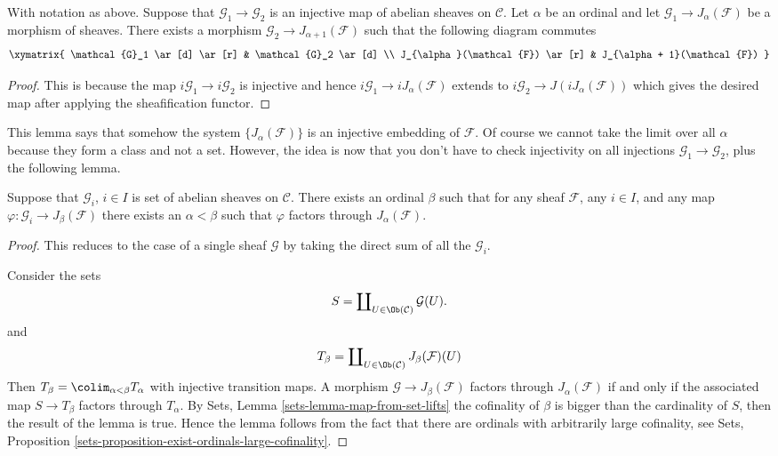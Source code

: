 \begin{lemma}
\label{lemma-map-into-next-one}
With notation as above.
Suppose that $\mathcal{G}_1 \to \mathcal{G}_2$ is an injective
map of abelian sheaves on $\mathcal{C}$. Let $\alpha$ be an ordinal
and let $\mathcal{G}_1 \to J_\alpha(\mathcal{F})$ be a morphism
of sheaves. There exists a morphism $\mathcal{G}_2 \to
J_{\alpha + 1}(\mathcal{F})$ such that the following diagram commutes
$$
\xymatrix{
\mathcal{G}_1 \ar[d] \ar[r] & \mathcal{G}_2 \ar[d] \\
J_{\alpha}(\mathcal{F}) \ar[r] & J_{\alpha + 1}(\mathcal{F}) }
$$
\end{lemma}

\begin{proof}
This is because the map $i\mathcal{G}_1 \to i\mathcal{G}_2$ is injective
and hence $i\mathcal{G}_1 \to iJ_\alpha(\mathcal{F})$ extends to
$i\mathcal{G}_2 \to J(iJ_\alpha(\mathcal{F}))$ which gives the
desired map after applying the sheafification functor.
\end{proof}

\noindent
This lemma says that somehow the system $\{J_{\alpha}(\mathcal{F})\}$
is an injective embedding of $\mathcal{F}$. Of course
we cannot take the limit over all $\alpha$ because they form a class
and not a set. However, the idea is now that you don't have to check
injectivity on all injections $\mathcal{G}_1 \to \mathcal{G}_2$, plus
the following lemma.

\begin{lemma}
\label{lemma-map-into-smaller}
Suppose that $\mathcal{G}_i$, $i\in I$ is set of abelian sheaves
on $\mathcal{C}$. There exists an ordinal $\beta$ such that
for any sheaf $\mathcal{F}$, any $i\in I$, and any map
$\varphi : \mathcal{G}_i \to J_\beta(\mathcal{F})$ there exists an
$\alpha < \beta$ such that $ \varphi $ factors through
$J_\alpha(\mathcal{F})$.
\end{lemma}

\begin{proof}
This reduces to the case of a single sheaf $\mathcal{G}$
by taking the direct sum of all the $\mathcal{G}_i$.

\medskip\noindent
Consider the sets
$$
S = \coprod\nolimits_{U \in \Ob(\mathcal{C})} \mathcal{G}(U).
$$
and
$$
T_\beta
=
\coprod\nolimits_{U \in \Ob(\mathcal{C})} J_\beta(\mathcal{F})(U)
$$
Then $T_\beta = \colim_{\alpha < \beta} T_\alpha$
with injective transition maps.
A morphism $\mathcal{G} \to J_\beta(\mathcal{F})$ factors
through $J_\alpha(\mathcal{F})$ if and only if
the associated map $S \to T_\beta$ factors through $T_\alpha$.
By
Sets, Lemma \ref{sets-lemma-map-from-set-lifts}
the cofinality of $\beta$ is bigger than the cardinality
of $S$, then the result of the lemma is true. Hence the lemma
follows from the fact that there are ordinals with arbitrarily
large cofinality, see
Sets, Proposition \ref{sets-proposition-exist-ordinals-large-cofinality}.
\end{proof}

